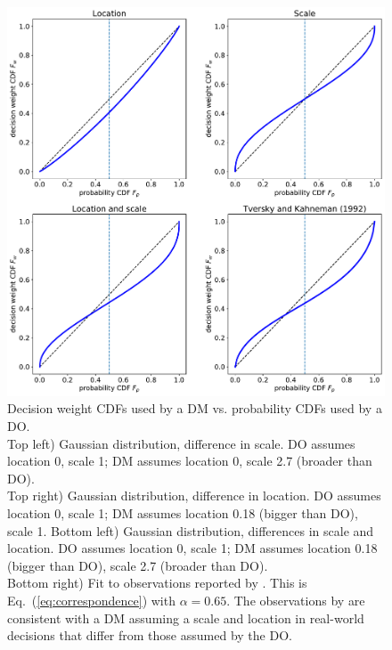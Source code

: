 \documentclass[%
	11pt,
	abstract=true,	
	bibliography=oldstyle					%
]{scrartcl}
\newcommand{\eref}[1]{Eq.~(\ref{eq:#1})}
\newcommand{\flabel}[1]{\label{fig:#1}}
\numberwithin{equation}{section}
\begin{document}
\begin{figure}
\centering
\includegraphics[width=1.0\textwidth]{./figs/Gauss_scale_location_both_KT.pdf}
\caption{Decision weight CDFs used by a DM vs. probability CDFs used by a DO.\\ 
Top left) Gaussian distribution, difference in scale. DO assumes location 0, scale 1; DM assumes location 0, scale 2.7 (broader than DO).\\ 
Top right) Gaussian distribution, difference in location. DO assumes location 0, scale 1; DM assumes location 0.18 (bigger than DO), scale 1.
Bottom left) Gaussian distribution, differences in scale and location. DO assumes location 0, scale 1; DM assumes location 0.18 (bigger than DO), scale 2.7 (broader than DO).\\ 
Bottom right) Fit to observations reported by \textcite{TverskyKahneman1992}. This is \eref{correspondence} with $\alpha=0.65$.
The observations by \textcite{TverskyKahneman1992} are consistent with a DM assuming a scale and location in real-world decisions that differ from those assumed by the DO.}
\flabel{CDF_weights}
\end{figure}
\end{document}
